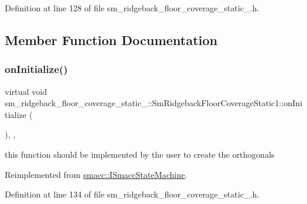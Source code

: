 Definition at line 128 of file sm\+\_\+ridgeback\+\_\+floor\+\_\+coverage\+\_\+static\+\_.\+h.



\subsection{Member Function Documentation}
\mbox{\label{structsm__ridgeback__floor__coverage__static__1_1_1SmRidgebackFloorCoverageStatic1_a292f8cefd736248aa6f780c4aaa7f018}} 
\subsubsection{\texorpdfstring{on\+Initialize()}{onInitialize()}}
{\footnotesize\ttfamily virtual void sm\+\_\+ridgeback\+\_\+floor\+\_\+coverage\+\_\+static\+\_\+::\+Sm\+Ridgeback\+Floor\+Coverage\+Static1\+::on\+Initialize (\begin{DoxyParamCaption}{ }\end{DoxyParamCaption})\hspace{0.3cm}{\ttfamily [inline]}, {\ttfamily [override]}, {\ttfamily [virtual]}}



this function should be implemented by the user to create the orthogonals 



Reimplemented from \hyperlink{classsmacc_1_1ISmaccStateMachine_ac2982c6c8283663e5e1e8a7c82f511ec}{smacc\+::\+I\+Smacc\+State\+Machine}.



Definition at line 134 of file sm\+\_\+ridgeback\+\_\+floor\+\_\+coverage\+\_\+static\+\_.\+h.


